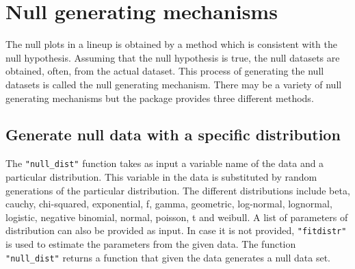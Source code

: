 \documentclass[article]{jss}
\begin{document}
\section{Null generating mechanisms}\label{null-gen}

The null plots in a lineup is obtained by a method which is consistent with the null hypothesis. Assuming that the null hypothesis is true, the null datasets are obtained, often, from the actual dataset. This process of generating the null datasets is called the null generating mechanism. There may be a variety of null generating mechanisms but the package provides
three different methods.

\subsection{Generate null data with a specific
distribution}\label{generate-null-data-with-a-specific-distribution}

The \texttt{"null\_dist"} function takes as input a variable name of the
data and a particular distribution. This variable in the data is
substituted by random generations of the particular distribution. The
different distributions include beta, cauchy, chi-squared, exponential,
f, gamma, geometric, log-normal, lognormal, logistic, negative binomial,
normal, poisson, t and weibull. A list of parameters of distribution can
also be provided as input. In case it is not provided,
\texttt{"fitdistr"} is used to estimate the parameters from the given
data. The function \texttt{"null\_dist"} returns a function that given
the data generates a null data set.

\end{document}
